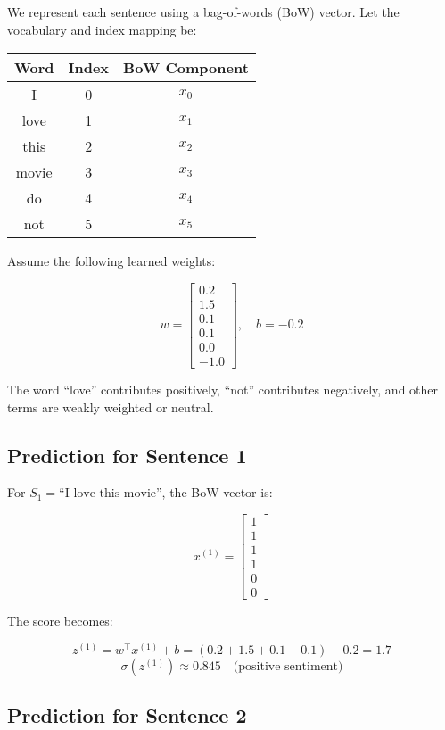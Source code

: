We represent each sentence using a bag-of-words (BoW) vector. Let the vocabulary and index mapping be:

\begin{center}
	\begin{tabular}{|c|c|c|}
		\hline
		\textbf{Word} & \textbf{Index} & \textbf{BoW Component} \\
		\hline
		I     & 0 & $x_0$ \\
		love  & 1 & $x_1$ \\
		this  & 2 & $x_2$ \\
		movie & 3 & $x_3$ \\
		do    & 4 & $x_4$ \\
		not   & 5 & $x_5$ \\
		\hline
	\end{tabular}
\end{center}

Assume the following learned weights:

\[
w =
\begin{bmatrix}
	0.2 \\ 1.5 \\ 0.1 \\ 0.1 \\ 0.0 \\ -1.0
\end{bmatrix}, \quad b = -0.2
\]

The word ``love'' contributes positively, ``not'' contributes negatively, and other terms are weakly weighted or neutral.

\subsection*{Prediction for Sentence 1}

For $S_1 = \text{``I love this movie''}$, the BoW vector is:

\[
x^{(1)} = \begin{bmatrix}1 \\ 1 \\ 1 \\ 1 \\ 0 \\ 0\end{bmatrix}
\]

The score becomes:

\[
z^{(1)} = w^\top x^{(1)} + b = (0.2 + 1.5 + 0.1 + 0.1) - 0.2 = 1.7
\]
\[
\sigma(z^{(1)}) \approx 0.845 \quad \text{(positive sentiment)}
\]

\subsection*{Prediction for Sentence 2}

